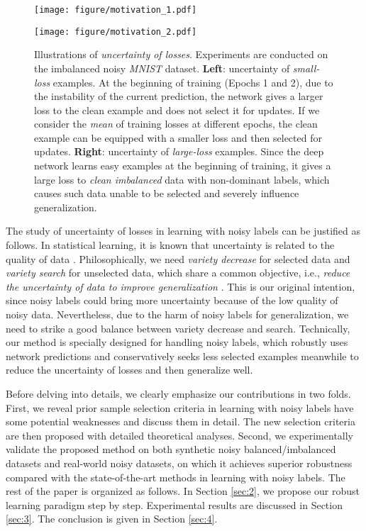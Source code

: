 \documentclass[11pt]{article}
\begin{document}
\begin{figure}[!t]
\centering
\begin{minipage}[t]{0.48\textwidth}
\centering
\texttt{[image: figure/motivation\_1.pdf]}
\end{minipage}
\begin{minipage}[t]{0.48\textwidth}
\centering
\texttt{[image: figure/motivation\_2.pdf]}
\end{minipage}
\vspace{-2pt}
\caption{\small{Illustrations of \textit{uncertainty of losses}. Experiments are conducted on the imbalanced noisy \textit{MNIST} dataset. \textbf{Left}: uncertainty of \textit{small-loss} examples. At the beginning of training (Epochs 1 and 2), due to the instability of the current prediction, the network gives a larger loss to the clean example and does not select it for updates. If we consider the \textit{mean} of training losses at different epochs, the clean example can be equipped with a smaller loss and then selected for updates. \textbf{Right}: uncertainty of \textit{large-loss} examples. Since the deep network learns easy examples at the beginning of training, it gives a large loss to \textit{clean imbalanced} data with non-dominant labels, which causes such data unable to be selected and severely influence generalization.}}
\label{fig:motivation}
\end{figure}

The study of uncertainty of losses in learning with noisy labels can be justified as follows. In statistical learning, it is known that uncertainty is related to the quality of data \citep{vapnik2013nature}. Philosophically, we need \textit{variety decrease} for selected data and \textit{variety search} for unselected data, which share a common objective, i.e., \textit{reduce the uncertainty of data to improve generalization} \citep{moore1990uncertainty}. This is our original intention, since noisy labels could bring more uncertainty because of the low quality of noisy data. Nevertheless, due to the harm of noisy labels for generalization, we need to strike a good balance between variety decrease and search. Technically, our method is specially designed for handling noisy labels, which robustly uses network predictions and conservatively seeks less selected examples meanwhile to reduce the uncertainty of losses and then generalize well.

Before delving into details, we clearly emphasize our contributions in two folds. First, we reveal prior sample selection criteria in learning with noisy labels have some potential weaknesses and discuss them in detail. The new selection criteria are then proposed with detailed theoretical analyses. Second, we experimentally validate the proposed method on both synthetic noisy balanced/imbalanced datasets and real-world noisy datasets, on which it achieves superior robustness compared with the state-of-the-art methods in learning with noisy labels. The rest of the paper is organized as follows. In Section \ref{sec:2}, we propose our robust learning paradigm step by step. Experimental results are discussed in Section \ref{sec:3}. The conclusion is given in Section \ref{sec:4}.
\vspace{-5pt}
\end{document}
